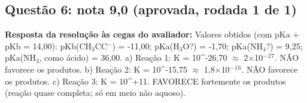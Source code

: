 \documentclass{article}%
\begin{document}
\subsection*{Questão 6: nota 9,0 (aprovada, rodada 1 de 1)}%
\textbf{Resposta da resolução às cegas do avaliador:} Valores obtidos (com pKa + pKb = 14,00): pKb(CH$_{3}$CC$^{-}$) = -11,00; pKa(H$_{3}$O?) = -1,70; pKa(NH$_{4}$?) = 9,25; pKa(NH$_{3}$, como ácido) = 36,00.\newline%
\newline%
a) Reação 1: K = 10\^{}-26,70 $\approx$ 2$\times$10$^{-}$$^2$$^{7}$. NÃO favorece os produtos.\newline%
b) Reação 2: K = 10\^{}-15,75 $\approx$ 1,8$\times$10$^{-}$$^{1}$$^{6}$. NÃO favorece os produtos.\newline%
c) Reação 3: K = 10\^{}+11. FAVORECE fortemente os produtos (reação quase completa; só em meio não aquoso).\par %
\end{document}
